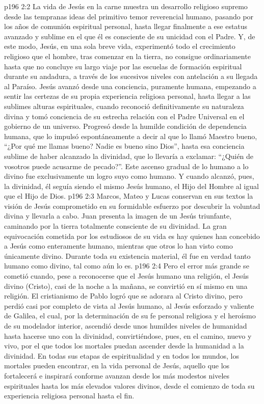 \vs p196 2:2 La vida de Jesús en la carne muestra un desarrollo religioso supremo desde las tempranas ideas del primitivo temor reverencial humano, pasando por los años de comunión espiritual personal, hasta llegar finalmente a ese estatus avanzado y sublime en el que él es consciente de su unicidad con el Padre. Y, de este modo, Jesús, en una sola breve vida, experimentó todo el crecimiento religioso que el hombre, tras comenzar en la tierra, no consigue ordinariamente hasta que no concluye su largo viaje por las escuelas de formación espiritual durante su andadura, a través de los sucesivos niveles con antelación a su llegada al Paraíso. Jesús avanzó desde una conciencia, puramente humana, empezando a sentir las certezas de su propia experiencia religiosa personal, hasta llegar a las sublimes alturas espirituales, cuando reconoció definitivamente su naturaleza divina y tomó conciencia de su estrecha relación con el Padre Universal en el gobierno de un universo. Progresó desde la humilde condición de dependencia humana, que lo impulsó espontáneamente a decir al que lo llamó Maestro bueno, “¿Por qué me llamas bueno? Nadie es bueno sino Dios”, hasta esa conciencia sublime de haber alcanzado la divinidad, que lo llevaría a exclamar: “¿Quién de vosotros puede acusarme de pecado?”. Este ascenso gradual de lo humano a lo divino fue exclusivamente un logro suyo como humano. Y cuando alcanzó, pues, la divinidad, él seguía siendo el mismo Jesús humano, el Hijo del Hombre al igual que el Hijo de Dios.
\vs p196 2:3 Marcos, Mateo y Lucas conservan en sus textos la visión de Jesús comprometido en su formidable esfuerzo por descubrir la voluntad divina y llevarla a cabo. Juan presenta la imagen de un Jesús triunfante, caminando por la tierra totalmente consciente de su divinidad. La gran equivocación cometida por los estudiosos de su vida es hay quienes han concebido a Jesús como enteramente humano, mientras que otros lo han visto como únicamente divino. Durante toda su existencia material, él fue en verdad tanto humano como divino, tal como aún lo es.
\vs p196 2:4 Pero el error más grande se cometió cuando, pese a reconocerse que el Jesús humano  una religión, el Jesús divino (Cristo), casi de la noche a la mañana, se convirtió en sí mismo en una religión. El cristianismo de Pablo logró que se adorara al Cristo divino, pero perdió casi por completo de vista al Jesús humano, al Jesús esforzado y valiente de Galilea, el cual, por la determinación de su fe personal religiosa y el heroísmo de su modelador interior, ascendió desde unos humildes niveles de humanidad hasta hacerse uno con la divinidad, convirtiéndose, pues, en el camino, nuevo y vivo, por el que todos los mortales puedan ascender desde la humanidad a la divinidad. En todas sus etapas de espiritualidad y en todos los mundos, los mortales pueden encontrar, en la vida personal de Jesús, aquello que los fortalecerá e inspirará conforme avanzan desde los más modestos niveles espirituales hasta los más elevados valores divinos, desde el comienzo de toda su experiencia religiosa personal hasta el fin.
